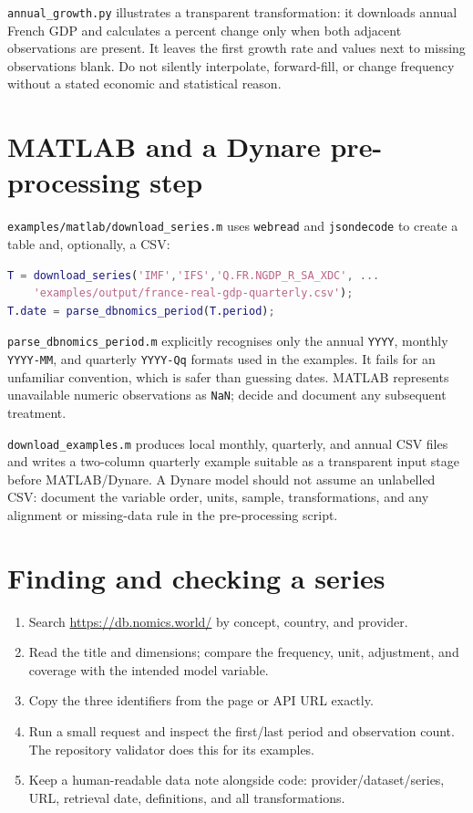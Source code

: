 \documentclass[11pt,a4paper]{article}
\begin{document}
\texttt{annual\_growth.py} illustrates a transparent transformation: it
downloads annual French GDP and calculates a percent change only when both
adjacent observations are present. It leaves the first growth rate and values
next to missing observations blank. Do not silently interpolate, forward-fill,
or change frequency without a stated economic and statistical reason.

\section{MATLAB and a Dynare pre-processing step}

\texttt{examples/matlab/download\_series.m} uses \texttt{webread} and
\texttt{jsondecode} to create a table and, optionally, a CSV:

\begin{lstlisting}[language=Matlab]
T = download_series('IMF','IFS','Q.FR.NGDP_R_SA_XDC', ...
    'examples/output/france-real-gdp-quarterly.csv');
T.date = parse_dbnomics_period(T.period);
\end{lstlisting}

\texttt{parse\_dbnomics\_period.m} explicitly recognises only the annual
\texttt{YYYY}, monthly \texttt{YYYY-MM}, and quarterly \texttt{YYYY-Qq}
formats used in the examples. It fails for an unfamiliar convention, which is
safer than guessing dates. MATLAB represents unavailable numeric observations
as \texttt{NaN}; decide and document any subsequent treatment.

\texttt{download\_examples.m} produces local monthly, quarterly, and annual
CSV files and writes a two-column quarterly example suitable as a transparent
input stage before MATLAB/Dynare. A Dynare model should not assume an
unlabelled CSV: document the variable order, units, sample, transformations,
and any alignment or missing-data rule in the pre-processing script.

\section{Finding and checking a series}

\begin{enumerate}
\item Search \url{https://db.nomics.world/} by concept, country, and provider.
\item Read the title and dimensions; compare the frequency, unit, adjustment,
      and coverage with the intended model variable.
\item Copy the three identifiers from the page or API URL exactly.
\item Run a small request and inspect the first/last period and observation
      count. The repository validator does this for its examples.
\item Keep a human-readable data note alongside code: provider/dataset/series,
      URL, retrieval date, definitions, and all transformations.
\end{enumerate}
\end{document}
